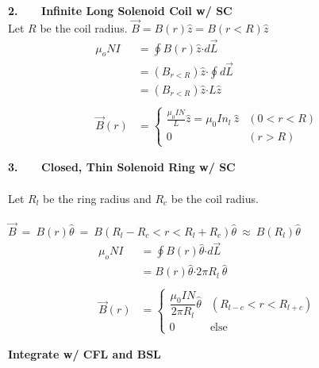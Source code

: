 \documentclass[12pt]{article}
\newcommand*{\dotP}{\boldsymbol \cdot}		%
\begin{document}
\begin{minipage}[t]{0.5\textwidth}
	\textbf{2. \ \ \ Infinite Long Solenoid Coil w/ SC}\\[10pt]
	Let \(R\) be the coil radius. \( \vec{B} = B(r) \hat{z} = B(r<R) \hat{z} \)\\
	\begin{align*}
		\mu_o NI &= \oint B(r) \hat{z} \dotP d\vec{ L }\\
		&= (B_{r<R}) \hat{z} \dotP \oint d\vec{L}\\
		&= (B_{r<R}) \hat{z} \dotP L \hat{z}\\ \\
		\vec{B}(r) &= \begin{cases}
			\frac{\mu_0 I N}{L} \hat{z} = \mu_0 I n_l \ \hat{z} & (0<r<R) \\
			0 & (r>R)
		\end{cases}
	\end{align*}

	\hfill \break
	\textbf{3. \ \ \ Closed, Thin Solenoid Ring w/ SC}\\ \\
	Let \(R_l\) be the ring radius and \(R_c\) be the coil radius.\\ \\
	\( \vec{B} \ = \ B(r) \hat{ \theta } 
		\ = \ B({\scriptstyle R_l-R_c < r < R_l+R_c}) \hat{ \theta } 
		\ \approx \ B( R_l ) \hat{ \theta }\)\\
	\begin{align*}
		\mu_o NI &= \oint B(r) \hat{ \theta } \dotP d\vec{ L }\\
		&= B(r) \hat{ \theta } \dotP 2 \pi R_l \ \hat{ \theta }\\ \\
		\vec{B}(r) &= \begin{cases} 
			\dfrac{\mu_0 I N}{2 \pi R_l} \hat{ \theta } & (R_{l-c}<r<R_{l+c}) \\
			0 & \text{else}
		\end{cases}
	\end{align*}
\end{minipage}

\newpage 
\noindent
\textbf{Integrate w/ CFL and BSL}
\end{document}
